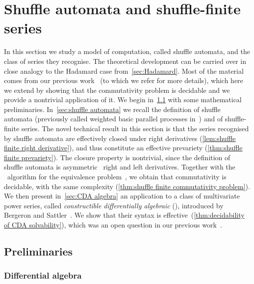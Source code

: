 \section{Shuffle automata and shuffle-finite series}
\label{sec:shuffle}

In this section we study a model of computation, called shuffle automata,
and the class of series they recognise.
%
The theoretical development can be carried over in close analogy to the Hadamard case from~\cref{sec:Hadamard}.
%
Most of the material comes from our previous work~\cite{Clemente:CONCUR:2024} (to which we refer for more details),
which here we extend by showing that the commutativity problem is decidable
and we provide a nontrivial application of it.
%
We begin in~\cref{sec:shuffle:preliminaries} with some mathematical preliminaries.
%
In~\cref{sec:shuffle automata} we recall the definition of shuffle automata
(previously called weighted basic parallel processes in~\cite{Clemente:CONCUR:2024})
and of shuffle-finite series.
%
The novel technical result in this section is that the series recognised by shuffle automata
are effectively closed under right derivatives (\cref{lem:shuffle finite right derivative}),
and thus constitute an effective prevariety (\cref{thm:shuffle finite prevariety}).
%
The closure property is nontrivial,
since the definition of shuffle automata is asymmetric \wrt~right and left derivatives.
%
Together with the \TWOEXPSPACE~algorithm for the equivalence problem~\cite[Theorem 1]{Clemente:CONCUR:2024},
we obtain that commutativity is decidable, with the same complexity (\cref{thm:shuffle finite commutativity problem}).
%
We then present in~\cref{sec:CDA algebra} an application to a class of multivariate power series,
called \emph{constructible differentially algebraic} (\CDA),
introduced by Bergeron and Sattler~\cite{BergeronSattler:TCS:1995}.
%
We show that their syntax is effective~(\cref{thm:decidability of CDA solvability}),
which was an open question in our previous work~\cite[Remark 27]{Clemente:CONCUR:2024}.

\subsection{Preliminaries}
\label{sec:shuffle:preliminaries}

\subsubsection{Differential algebra}


